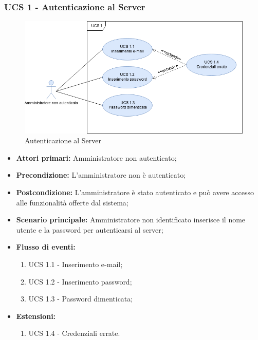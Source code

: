\newpage

\subsubsection{UCS 1 - Autenticazione al Server}

\begin{figure}[h]
    \centering
    \includegraphics[scale=0.6]{sezioni/UseCase/Immagini/UCS1.png}
    \caption{Autenticazione al Server}
\end{figure}

\begin{itemize}
\item \textbf{Attori primari:} Amministratore non autenticato;
\item \textbf{Precondizione:} L'amministratore non è autenticato;
\item \textbf{Postcondizione:} L'amministratore è stato autenticato e può avere accesso alle funzionalità offerte dal sistema;
\item \textbf{Scenario principale:} Amministratore non identificato inserisce il nome utente e la password per autenticarsi al server;
\item \textbf{Flusso di eventi:}
    \begin{enumerate}
        \item UCS 1.1 - Inserimento e-mail;
        \item UCS 1.2 - Inserimento password;
        \item UCS 1.3 - Password dimenticata;
    \end{enumerate}
\item \textbf{Estensioni:}
	\begin{enumerate}		
		\item UCS 1.4 - Credenziali errate.
	\end{enumerate}
\end{itemize}

